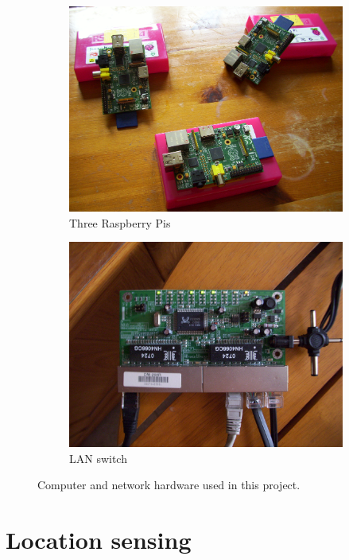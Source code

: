 \begin{figure}[h]
	\begin{subfigure}[b]{0.5\textwidth}
		\includegraphics[width=\textwidth]{figures/pis}
		\caption{Three Raspberry Pis}
		\label{fig:pis}
	\end{subfigure}
	\begin{subfigure}[b]{0.5\textwidth}
		\includegraphics[width=\textwidth]{figures/switch}
		\caption{LAN switch}
	\end{subfigure}
	\caption{Computer and network hardware used in this project.}
	\label{fig:projcomp}
\end{figure}

\section{Location sensing}
\label{sec:locsens}


